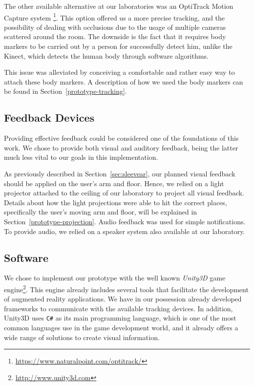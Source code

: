 The other available alternative at our laboratories was an OptiTrack Motion Capture system \footnote{\url{https://www.naturalpoint.com/optitrack/}}. 
This option offered us a more precise tracking, and the possibility of dealing with occlusions due to the usage of multiple cameras scattered around the room. 
The downside is the fact that it requires body markers to be carried out by a person for successfully detect him, unlike the 
Kinect, which detects the human body through software algorithms. 

This issue was alleviated by conceiving a comfortable and rather easy way to attach these body markers. A description of how we used the body markers can be found in Section~\ref{prototype-tracking}.


\subsection{Feedback Devices}

Providing effective feedback could be considered one of the foundations of this work. 
We chose to provide both visual and auditory feedback, being the latter much less vital to our goals in this implementation.

As previously described in Section~\ref{sec:sleevear}, our planned visual feedback should be applied on the user's arm and floor. Hence, we relied on a light projector attached to the ceiling of our laboratory to project all visual feedback.
Details about how the light projections were able to hit the correct places, specifically the user's moving arm and floor, will be explained in Section~\ref{prototype-projection}.
Audio feedback was used for simple notifications.
To provide audio, we relied on a speaker system also available at our laboratory.

\subsection{Software}

We chose to implement our prototype with the well known \emph{Unity3D} game engine\footnote{\url{http://www.unity3d.com}}.
This engine already includes several tools that facilitate the development of augmented reality applications. We have in our possession already developed frameworks to communicate with the available tracking devices. In addition, Unity3D uses \texttt{C\#} as its main programming language, which is one of the most common languages use in the game development world, and it already offers a wide range of solutions to create visual information.

